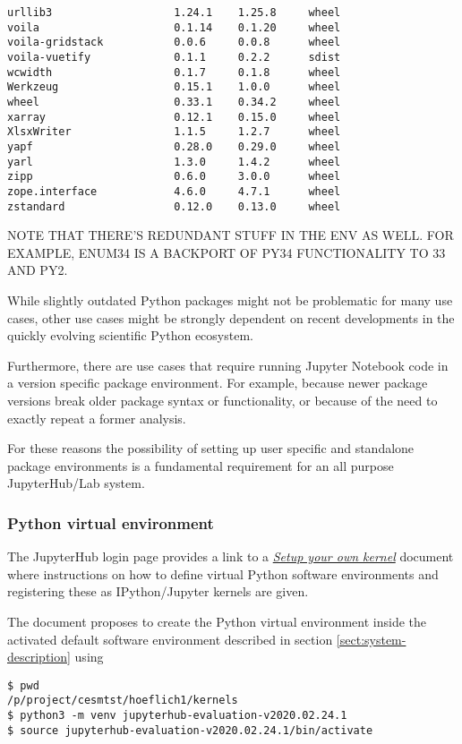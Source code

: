 \documentclass[11pt,a4paper]{article}
\begin{document}
\begin{verbatim}
urllib3                   1.24.1    1.25.8     wheel
voila                     0.1.14    0.1.20     wheel
voila-gridstack           0.0.6     0.0.8      wheel
voila-vuetify             0.1.1     0.2.2      sdist
wcwidth                   0.1.7     0.1.8      wheel
Werkzeug                  0.15.1    1.0.0      wheel
wheel                     0.33.1    0.34.2     wheel
xarray                    0.12.1    0.15.0     wheel
XlsxWriter                1.1.5     1.2.7      wheel
yapf                      0.28.0    0.29.0     wheel
yarl                      1.3.0     1.4.2      wheel
zipp                      0.6.0     3.0.0      wheel
zope.interface            4.6.0     4.7.1      wheel
zstandard                 0.12.0    0.13.0     wheel
\end{verbatim}

NOTE THAT THERE'S REDUNDANT STUFF IN THE ENV AS WELL. FOR EXAMPLE, ENUM34 IS A BACKPORT OF PY34 FUNCTIONALITY TO 33 AND PY2.

While slightly outdated Python packages might not be problematic for many use cases, other use cases might be strongly dependent on recent developments in the quickly evolving scientific Python ecosystem.

Furthermore, there are use cases that require running Jupyter Notebook code in a version specific package environment.
For example, because newer package versions break older package syntax or functionality, or because of the need to exactly repeat a former analysis.

For these reasons the possibility of setting up user specific and standalone package environments is a fundamental requirement for an all purpose JupyterHub/Lab system.

\subsubsection{Python virtual environment}
\label{sect:python-kernel:virtual-environment}

The JupyterHub login page provides a link to a \href{https://jupyter-jsc.fz-juelich.de/hub/static/files/kernel.html}{\emph{Setup your own kernel}} document where instructions on how to define virtual Python software environments and registering these as IPython/Jupyter kernels are given.

The document proposes to create the Python virtual environment inside the activated default software environment described in section \ref{sect:system-description} using

\begin{verbatim}
$ pwd
/p/project/cesmtst/hoeflich1/kernels
$ python3 -m venv jupyterhub-evaluation-v2020.02.24.1
$ source jupyterhub-evaluation-v2020.02.24.1/bin/activate
\end{verbatim}
\end{document}
